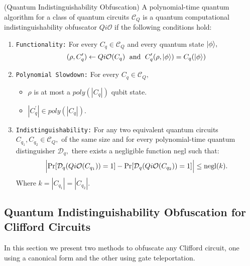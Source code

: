 \begin{definition}{\rm (Quantum Indistinguishability Obfuscation)}
\label{def:QiO} 
A  polynomial-time quantum algorithm for a class of quantum circuits $\mathcal{C}_Q$ is a quantum computational indistinguishability obfuscator $Qi\mathcal{O}$  if the following conditions hold:

\begin{enumerate}
\item {\tt Functionality:}  For every $C_q\in \mathcal{C}_Q$ and every quantum state ${\lvert}\phi\rangle,$
$$(\rho, C_q^\prime)\leftarrow Qi\mathcal{O}(C_q) \;  \mbox{ and }\; C_q^\prime(\rho,{\lvert}\phi\rangle)=C_{q}({\lvert}\phi\rangle)$$
											

\item  {\tt Polynomial Slowdown:}  For every $C_{q}\in \mathcal{C}_Q,$
\begin{itemize}
\item  $\rho$ is at most a $poly(|C_{q}|)$ qubit state. 
\item $|C_{q}^\prime| \in poly(|C_{q}|).$
\end{itemize}

\item {\tt Indistinguishability:} For any two equivalent quantum circuits $C_{q_1},C_{q_2}\in \mathcal{C}_Q,$ of the same size
 and for every polynomial-time quantum distinguisher $\mathcal{D}_q,$ there exists a negligible function {\rm negl} such that:
					$$\Big |{\rm Pr}[\mathcal{D}_q(Qi\mathcal{O}(C_{q_1}))=1]-{\rm Pr}[\mathcal{D}_q(Qi\mathcal{O}(C_{q_2}))=1] \Big |\leq  {\rm negl}(k).$$		
Where $k=|C_{q_1}|=|C_{q_2}|.$						
\end{enumerate}
\end{definition}


\subsection{Quantum Indistinguishability Obfuscation for Clifford Circuits}
\label{QiO:Clifford-Circuits}
 In this section we present two methods to obfuscate any Clifford circuit,  one using a canonical form and the other using gate teleportation.

